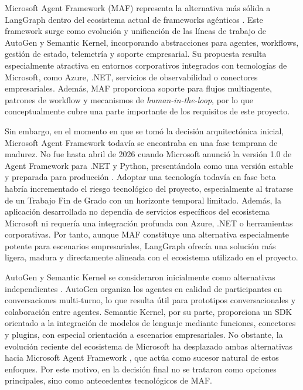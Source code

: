 \documentclass[12pt,a4paper]{article}
\theoremstyle{plain}
\begin{document}
Microsoft Agent Framework (MAF) representa la alternativa más sólida a LangGraph dentro del ecosistema actual de frameworks agénticos \cite{microsoft_agent_framework_overview}. Este framework surge como evolución y unificación de las líneas de trabajo de AutoGen y Semantic Kernel, incorporando abstracciones para agentes, workflows, gestión de estado, telemetría y soporte empresarial. Su propuesta resulta especialmente atractiva en entornos corporativos integrados con tecnologías de Microsoft, como Azure, .NET, servicios de observabilidad o conectores empresariales. Además, MAF proporciona soporte para flujos multiagente, patrones de workflow y mecanismos de \textit{human-in-the-loop}, por lo que conceptualmente cubre una parte importante de los requisitos de este proyecto.

Sin embargo, en el momento en que se tomó la decisión arquitectónica inicial, Microsoft Agent Framework todavía se encontraba en una fase temprana de madurez. No fue hasta abril de 2026 cuando Microsoft anunció la versión 1.0 de Agent Framework para .NET y Python, presentándola como una versión estable y preparada para producción \cite{microsoft_agent_framework_1_0}. Adoptar una tecnología todavía en fase beta habría incrementado el riesgo tecnológico del proyecto, especialmente al tratarse de un Trabajo Fin de Grado con un horizonte temporal limitado. Además, la aplicación desarrollada no dependía de servicios específicos del ecosistema Microsoft ni requería una integración profunda con Azure, .NET o herramientas corporativas. Por tanto, aunque MAF constituye una alternativa especialmente potente para escenarios empresariales, LangGraph ofrecía una solución más ligera, madura y directamente alineada con el ecosistema utilizado en el proyecto.

AutoGen y Semantic Kernel se consideraron inicialmente como alternativas independientes \cite{autogen_github, semantic_kernel_overview}. AutoGen organiza los agentes en calidad de participantes en conversaciones multi-turno, lo que resulta útil para prototipos conversacionales y colaboración entre agentes. Semantic Kernel, por su parte, proporciona un SDK orientado a la integración de modelos de lenguaje mediante funciones, conectores y plugins, con especial orientación a escenarios empresariales. No obstante, la evolución reciente del ecosistema de Microsoft ha desplazado ambas alternativas hacia Microsoft Agent Framework \cite{microsoft_agent_framework_overview, autogen_github}, que actúa como sucesor natural de estos enfoques. Por este motivo, en la decisión final no se trataron como opciones principales, sino como antecedentes tecnológicos de MAF.
\end{document}
